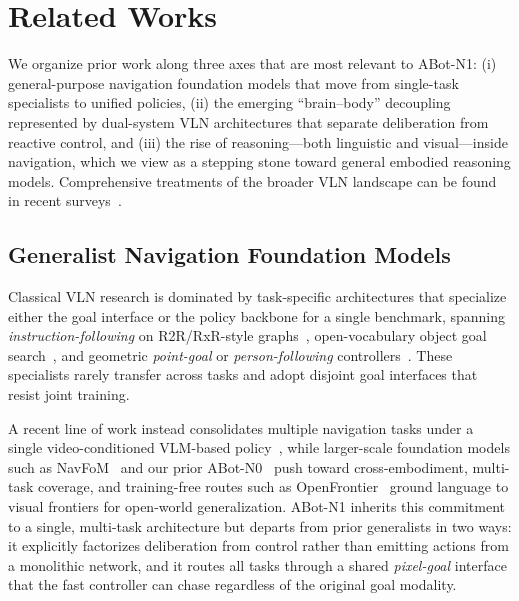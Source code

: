 \section{Related Works}
\label{sec:related}

We organize prior work along three axes that are most relevant to ABot-N1:
(i) general-purpose navigation foundation models that move from
single-task specialists to unified policies, (ii) the emerging
``brain--body'' decoupling represented by dual-system VLN architectures
that separate deliberation from reactive control, and (iii) the rise of
reasoning---both linguistic and visual---inside navigation, which we view
as a stepping stone toward general embodied reasoning models. Comprehensive
treatments of the broader VLN landscape can be found in recent
surveys~\cite{gu2022vlnsurvey,hossain2026review,zhang2026llmvln}.

\subsection{Generalist Navigation Foundation Models}
\label{sec:rw-generalist}

Classical VLN research is dominated by task-specific architectures that
specialize either the goal interface or the policy backbone for a single
benchmark, spanning \textit{instruction-following} on R2R/RxR-style
graphs~\cite{anderson2018vln,ku2020rxr,chen2021topological,an2024etpnav,an2022rxrhabitat,chen2022weakly},
open-vocabulary object goal
search~\cite{yokoyama2024hmovon,batra2020objectnav}, and geometric
\textit{point-goal} or \textit{person-following}
controllers~\cite{savva2019habitat,wang2025trackvla}. These specialists
rarely transfer across tasks and adopt disjoint goal interfaces that
resist joint training.

A recent line of work instead consolidates multiple navigation tasks
under a single video-conditioned VLM-based
policy~\cite{zhang2024navid,zhang2024uninavid,chiang2024mobilityvla},
while larger-scale foundation models such as
NavFoM~\cite{zhang2025navfom} and our prior
ABot-N0~\cite{abotn0} push toward cross-embodiment, multi-task coverage,
and training-free routes such as OpenFrontier~\cite{sun2026openfrontier}
ground language to visual frontiers for open-world generalization.
ABot-N1 inherits this commitment to a single, multi-task architecture
but departs from prior generalists in two ways: it explicitly factorizes
deliberation from control rather than emitting actions from a monolithic
network, and it routes all tasks through a shared \emph{pixel-goal}
interface that the fast controller can chase regardless of the original
goal modality.


